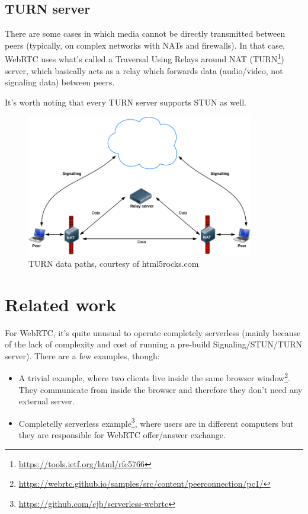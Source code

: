 \documentclass[paper=a4, fontsize=11pt]{scrartcl} %
\numberwithin{equation}{section} %
\numberwithin{figure}{section} %
\numberwithin{table}{section} %
\begin{document}
\subsection{TURN server} 

There are some cases in which media cannot be directly transmitted between peers (typically, on complex networks with NATs and firewalls). In that case, WebRTC uses what's called a Traversal Using Relays around NAT (TURN\footnote{\url{https://tools.ietf.org/html/rfc5766}}) server, which basically acts as a relay which forwards data (audio/video, not signaling data) between peers. 

It's worth noting that every TURN server supports STUN as well.

\begin{figure}[ht!]
	\centering
	\includegraphics[width=375px]{dataPathways.png}
	\caption{TURN data paths, courtesy of html5rocks.com}
\end{figure}

\section{Related work}

For WebRTC, it's quite unusual to operate completely serverless (mainly because of the lack of complexity and cost of running a pre-build Signaling/STUN/TURN server). There are a few examples, though: 

\begin{itemize}
	\item A trivial example, where two clients live inside the same browser window\footnote{\url{https://webrtc.github.io/samples/src/content/peerconnection/pc1/}}. They communicate from inside the browser and therefore they don't need any external server.
	\item Completelly serverless example\footnote{\url{https://github.com/cjb/serverless-webrtc}}, where users are in different computers but they are responsible for WebRTC offer/answer exchange. 
\end{itemize}
\end{document}
